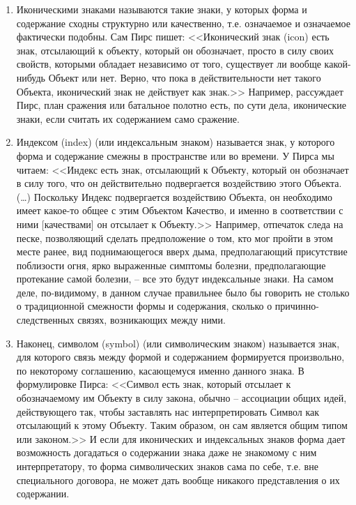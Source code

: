 \begin{enumerate}
\item Иконическими знаками называются такие знаки, у которых форма
  и содержание сходны структурно или качественно, т.е. означаемое
  и означаемое фактически подобны. Сам Пирс пишет: <<Иконический знак (icon)
  есть знак, отсылающий к объекту, который он обозначает, просто в силу
  своих свойств, которыми обладает независимо от того, существует ли
  вообще какой-нибудь Объект или нет. Верно, что пока в действительности
  нет такого Объекта, иконический знак не действует как знак.>> \autocite[][185]{jakobson1985}
  Например, рассуждает Пирс, план сражения или батальное полотно есть,
  по сути дела, иконические знаки, если считать их содержанием само сражение.
\item Индексом (index) (или индексальным знаком) называется знак, у которого
  форма и содержание смежны в пространстве или во времени.
  У Пирса мы читаем: <<Индекс есть знак, отсылающий к Объекту, который он
  обозначает в силу того, что он действительно подвергается воздействию
  этого Объекта. (\ldots) Поскольку Индекс подвергается воздействию
  Объекта, он необходимо имеет какое-то общее с этим Объектом Качество,
  и именно в соответствии с ними [качествами] он отсылает к Объекту.>> \autocite[][186]{jakobson1985}
  Например, отпечаток следа на песке, позволяющий сделать предположение о том,
  кто мог пройти в этом месте ранее, вид поднимающегося вверх дыма,
  предполагающий присутствие поблизости огня, ярко выраженные симптомы болезни,
  предполагающие протекание самой болезни, -- все это будут индексальные знаки.
  На самом деле, по-видимому, в данном случае правильнее было бы говорить не
  столько о традиционной смежности формы и содержания, сколько о
  причинно-следственных связях, возникающих между ними.
\item Наконец, символом (symbol) (или символическим знаком) называется знак,
  для которого связь между формой и содержанием формируется произвольно,
  по некоторому соглашению, касающемуся именно данного знака. В формулировке
  Пирса: <<Символ есть знак, который отсылает к обозначаемому им Объекту в силу
  закона, обычно -- ассоциации общих идей, действующего так, чтобы заставлять
  нас интерпретировать Символ как отсылающий к этому Объекту. Таким образом,
  он сам является общим типом или законом.>> \autocite[][186]{jakobson1985} И если для иконических
  и индексальных знаков форма дает возможность догадаться о содержании знака
  даже не знакомому с ним интерпретатору, то форма символических знаков сама
  по себе, т.е. вне специального договора, не  может дать  вообще никакого
  представления о их содержании.
\end{enumerate}

